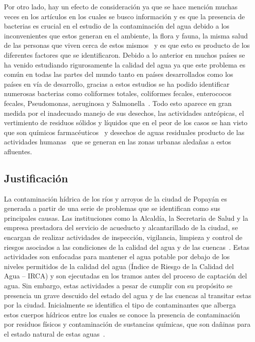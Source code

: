 Por otro lado, hay un efecto de consideración ya que se hace mención muchas veces en los artículos en los cuales se busco información y es que la presencia de bacterias es crucial en el estudio de la contaminación del agua debido a los inconvenientes que estos generan en el ambiente, la flora y fauna, la misma salud de las personas que viven cerca de estos mismos~\cite{MendozaCarino2014} y es que esto es producto de los diferentes factores que se identificaron. Debido a lo anterior en muchos países se ha venido estudiando rigurosamente la calidad del agua ya que este problema es común en todas las partes del mundo tanto en países desarrollados como los países en vía de desarrollo, gracias a estos estudios se ha podido identificar numerosas bacterias como coliformes totales, coliformes fecales, enterococos fecales, Pseudomonas, aeruginosa y Salmonella~\cite{}. Todo esto aparece en gran medida por el inadecuado manejo de sus desechos, las actividades antrópicas, el vertimiento de residuos sólidos y líquidos que en el peor de los casos se han visto que son químicos farmacéuticos~\cite{Garcia-Morales2021} y desechos de aguas residuales producto de las actividades humanas~\cite {Ahumada-Santos2014} que se generan en las zonas urbanas aledañas a estos afluentes.
\subsection{Justificación}
La contaminación hídrica de los ríos y arroyos de la ciudad de Popayán es generada a partir de una serie de problemas que se identifican como sus principales causas. Las instituciones como la Alcaldía, la Secretaria de Salud y la empresa prestadora del servicio de acueducto y alcantarillado de la ciudad, se encargan de realizar actividades de inspección, vigilancia, limpieza y control de riesgos asociados a las condiciones de la calidad del agua y de las cuencas~\cite{SecretariadeSalud2019}. Estas actividades son enfocadas para mantener el agua potable por debajo de los niveles permitidos de la calidad del agua (Índice de Riesgo de la Calidad del Agua -- IRCA) y son ejecutadas en los tramos antes del proceso de captación del agua. Sin embargo, estas actividades a pesar de cumplir con su propósito se presencia un grave descuido del estado del agua y de las cuencas al transitar estas por la ciudad. Inicialmente se identifica el tipo de contaminantes que alberga estos cuerpos hídricos entre los cuales se conoce la presencia de contaminación por residuos físicos y contaminación de sustancias químicas, que son dañinas para el estado natural de estas aguas~\cite{Aquae}.
